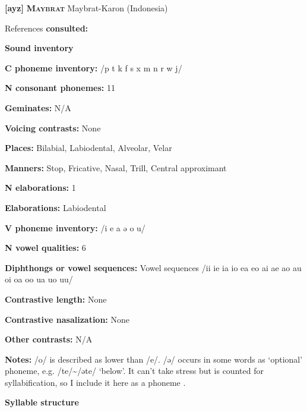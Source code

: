 \textbf{[ayz]}   \textbf{\textsc{Maybrat}}  Maybrat-Karon (Indonesia)



References \textbf{consulted:} \citet{Dol2007}



\textbf{Sound inventory}



\textbf{C phoneme inventory:} /p t k f s x m n r w j/



\textbf{N consonant phonemes:} 11



\textbf{Geminates:} N/A



\textbf{Voicing contrasts:} None



\textbf{Places:} Bilabial, Labiodental, Alveolar, Velar



\textbf{Manners:} Stop, Fricative, Nasal, Trill, Central approximant



\textbf{N elaborations:} 1



\textbf{Elaborations:} Labiodental



\textbf{V phoneme inventory:} /i e a ə o u/



\textbf{N vowel qualities:} 6



\textbf{Diphthongs or vowel sequences:} Vowel sequences /ii ie ia io ea eo ai ae ao au oi oa oo ua uo uu/



\textbf{Contrastive length:} None



\textbf{Contrastive nasalization:} None



\textbf{Other contrasts:} N/A



\textbf{Notes:} /o/ is described as lower than /e/. /ə/ occurs in some words as ‘optional’ phoneme, e.g. /te/{\textasciitilde}/əte/ ‘below’. It can’t take stress but is counted for syllabification, so I include it here as a phoneme \citep[15-18]{Dol2007}.



\textbf{Syllable structure}



